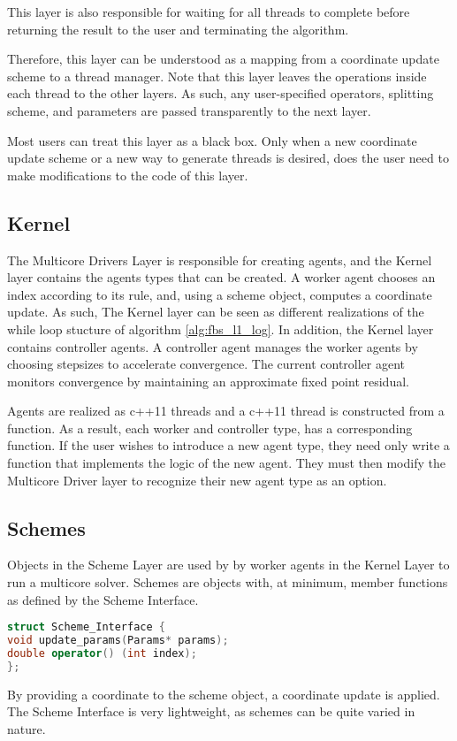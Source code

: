 This layer is also responsible for waiting for all threads to complete before returning the result to the user and terminating the algorithm.    

Therefore, this layer can be understood as a mapping from a coordinate update scheme to a thread manager. Note that this layer leaves the operations inside each thread to the other layers. As such, any user-specified operators, splitting scheme, and parameters are passed transparently to the next layer.

Most users can treat this layer as a black box. Only when a new coordinate update scheme or a new way to generate threads is desired, does the user need to make modifications to the code of this layer.


\subsection{Kernel}


The Multicore Drivers Layer is responsible for creating agents, and the Kernel layer contains the agents types that can be created.
A worker agent chooses an index according to its rule, and, using a scheme object, computes a coordinate update.
As such, The Kernel layer can be seen as different realizations of the while loop stucture of algorithm \ref{alg:fbs_l1_log}.
In addition, the Kernel layer contains controller agents.
A controller agent manages the worker agents by choosing stepsizes to accelerate convergence.
The current controller agent monitors convergence by maintaining an approximate fixed point residual.

Agents are realized as c++11 threads and a c++11 thread is constructed from a function.
As a result, each worker and controller type, has  a corresponding function.
If the user wishes to introduce a new agent type, they need only write a function that implements the logic of the new agent.
They must then modify the Multicore Driver layer to recognize their new agent type as an option.

\subsection{Schemes}

Objects in the Scheme Layer are used by by worker agents in the Kernel Layer to run a multicore solver.
Schemes are objects with, at minimum, member functions as defined by the Scheme Interface.
\begin{lstlisting}[language=C++]
struct Scheme_Interface {
void update_params(Params* params);
double operator() (int index);
};
\end{lstlisting}
By providing a coordinate to the scheme object, a coordinate update is applied.
The Scheme Interface is very lightweight, as schemes can be quite varied in nature.

